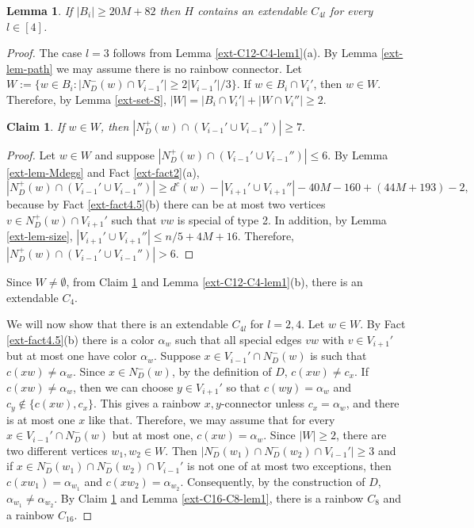 \documentclass{article}
\newtheorem{lemma}[theorem]{Lemma}
\newtheorem{claim}[theorem]{Claim}
\begin{document}
\begin{lemma}\label{ext-lem-B_i}
If $|B_i|\geq 20M+82$ then $H$ contains an extendable $C_{4l}$ for every $l\in [4]$.
\end{lemma}
\begin{proof}
The case $l=3$ follows from Lemma \ref{ext-C12-C4-lem1}(a). By Lemma \ref{ext-lem-path} we may assume there is no rainbow connector. Let $W:= \{w\in B_i: |N^-_D(w)\cap V_{i-1}'|\geq  2|V_{i-1}'|/3\}$. 
If $w\in B_i\cap V_i'$, then $w\in W$. Therefore, by Lemma \ref{ext-set-S}, $|W|= |B_i\cap V_i'|+ |W\cap V_i''|\geq 2.$
\begin{claim}\label{ext-cl>=7} If $w\in W$, then $|N^+_D(w) \cap (V_{i-1}'\cup V_{i-1}'')|\geq 7.$
\end{claim}
\begin{proof} Let $w\in W$ and suppose $|N^+_D(w)\cap (V_{i-1}'\cup V_{i-1}'')|\leq 6$. By Lemma \ref{ext-lem-Mdegs} and Fact \ref{ext-fact2}(a),
$$|N_D^+(w)\cap (V_{i-1}'\cup V_{i-1}'')|\geq d^c(w)- |V_{i+1}'\cup V_{i+1}''|- 40M-160+ (44M+193)-2,$$
because by Fact \ref{ext-fact4.5}(b) there can be at most two vertices $v\in N^+_D(w)\cap V_{i+1}'$ such that $vw$ is special of type 2.
In addition, by Lemma \ref{ext-lem-size}, $|V_{i+1}'\cup V_{i+1}''|\leq n/5 +4M+16.$
Therefore, 
$|N^+_D(w)\cap (V_{i-1}'\cup V_{i-1}'')|> 6$.
\end{proof}
Since $W \neq \emptyset$, from Claim \ref{ext-cl>=7} and  Lemma \ref{ext-C12-C4-lem1}(b), there is an extendable $C_4$.

We will now show that there is an extendable $C_{4l}$ for $l=2,4$. Let $w\in W$. By Fact \ref{ext-fact4.5}(b) there is a color $\alpha_w$ such that all special edges $vw$ with $v\in V_{i+1}'$ but at most one have color $\alpha_w$.  Suppose $x\in V_{i-1}'\cap N^-_D(w)$ is such that $c(xw)\neq {\alpha}_w$. Since $x\in N^-_D(w)$, by the definition of $D$, $c(xw)\neq c_x$. If $c(xw)\neq \alpha_w$, then we can choose $y\in V_{i+1}'$ so that $c(wy)=\alpha_w$ and $c_y\notin \{c(xw),c_x\}$. This gives a rainbow $x,y$-connector unless $c_x = \alpha_w$, and there is at most one $x$ like that. Therefore, we may assume that for every $x\in V_{i-1}'\cap N^-_D(w)$ but at most one, $c(xw)=\alpha_w$. Since $|W|\geq 2$, there are two different vertices $w_1,w_2\in W$. Then $|N^-_D(w_1)\cap N^-_D(w_2)\cap V_{i-1}'|\geq 3$ and if $x\in N^-_D(w_1)\cap N^-_D(w_2)\cap V_{i-1}'$ is not one of at most two exceptions, then $c(xw_1)=\alpha_{w_1}$ and $c(xw_2)=\alpha_{w_2}$. Consequently, by the construction of $D$, $\alpha_{w_1}\neq \alpha_{w_2}$. By Claim \ref{ext-cl>=7} and Lemma \ref{ext-C16-C8-lem1}, there is a rainbow $C_8$ and a  rainbow  $C_{16}$. 
\end{proof}
\end{document}
